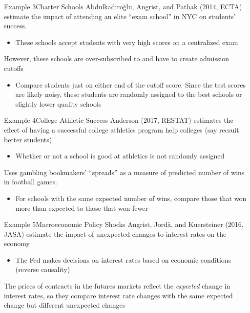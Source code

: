 \documentclass[aspectratio=169,t,11pt,table]{beamer}
\begin{document}
\begin{frame}{Example 3}{Charter Schools}
  Abdulkadiroğlu, Angrist, and Pathak (2014, ECTA) estimate the impact of attending an elite ``exam school'' in NYC on students' success.
  \begin{itemize}
    \item These schools accept students with very high scores on a centralized exam
  \end{itemize}

  \pause
  \bigskip
  However, these schools are over-subscribed to and have to create admission cutoffs 
  \begin{itemize}
    \item Compare students just on either end of the cutoff score. Since the test scores are likely noisy, these students are randomly assigned to the best schools or slightly lower quality schools
  \end{itemize}
\end{frame}

\begin{frame}{Example 4}{College Athletic Success}
  Anderson (2017, RESTAT) estimates the effect of having a successful college athletics program help colleges (say recruit better students)

  \begin{itemize}
    \item Whether or not a school is good at athletics is not randomly assigned
  \end{itemize}
  
  \pause
  \bigskip
  Uses gambling bookmakers' ``spreads'' as a measure of predicted number of wins in football games. 
  \begin{itemize}
    \item For schools with the same expected number of wins, compare those that won more than expected to those that won fewer
  \end{itemize}
\end{frame}

\begin{frame}{Example 5}{Macroeconomic Policy Shocks}
  Angrist, Jordà, and Kuersteiner (2016, JASA) estimate the impact of unexpected changes to interest rates on the economy

  \begin{itemize}
    \item The Fed makes decisions on interest rates based on economic conditions (reverse causality)
  \end{itemize}

  \pause
  \bigskip
  The prices of contracts in the futures markets reflect the \emph{expected} change in interest rates, so they compare interest rate changes with the same expected change but different unexpected changes
\end{frame}
\end{document}
